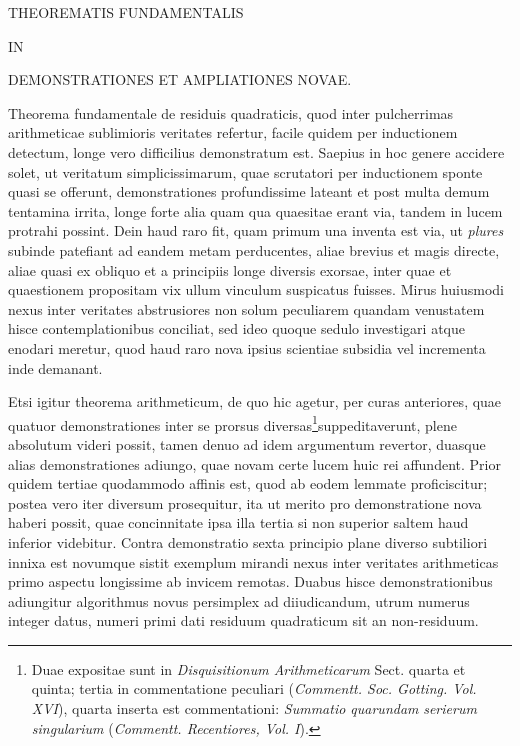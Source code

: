 \begin{center}
{\large THEOREMATIS FUNDAMENTALIS\par}
\smallskip IN\par
{}
\medskip DEMONSTRATIONES ET AMPLIATIONES NOVAE.\par
\end{center}
\BookRule{20mm}
Theorema fundamentale de residuis quadraticis, quod inter pulcherrimas arithmeticae sublimioris veritates refertur, facile quidem per inductionem detectum, longe vero difficilius demonstratum est. Saepius in hoc genere accidere solet, ut veritatum simplicissimarum, quae scrutatori per inductionem sponte quasi se offerunt, demonstrationes profundissime lateant et post multa demum tentamina irrita, longe forte alia quam qua quaesitae erant via, tandem in lucem protrahi possint. Dein haud raro fit, quam primum una inventa est via, ut \textit{plu}\textit{res} subinde patefiant ad eandem metam perducentes, aliae brevius et magis directe, aliae quasi ex obliquo et a principiis longe diversis exorsae, inter quae et quaestionem propositam vix ullum vinculum suspicatus fuisses. Mirus huiusmodi nexus inter veritates abstrusiores non solum peculiarem quandam venustatem hisce contemplationibus conciliat, sed ideo quoque sedulo investigari atque enodari meretur, quod haud raro nova ipsius scientiae subsidia vel incrementa inde demanant.

Etsi igitur theorema arithmeticum, de quo hic agetur, per curas anteriores, quae quatuor demonstrationes inter se prorsus diversas\begingroup\renewcommand{\thefootnote}{*)}\footnote{Duae expositae sunt in \textit{Disquisitionum Arithmeticarum} Sect. quarta et quinta; tertia in commentatione peculiari (\textit{Commentt. Soc. Gotting. Vol. XVI}), quarta inserta est commentationi: \textit{Summatio quarundam} \textit{serierum singularium} (\textit{Commentt. Recentiores, Vol. I}).}\endgroup suppeditaverunt, plene
%
absolutum videri possit, tamen denuo ad idem argumentum revertor, duasque alias demonstrationes adiungo, quae novam certe lucem huic rei affundent. Prior quidem tertiae quodammodo affinis est, quod ab eodem lemmate proficiscitur; postea vero iter diversum prosequitur, ita ut merito pro demonstratione nova haberi possit, quae concinnitate ipsa illa tertia si non superior saltem haud inferior videbitur. Contra demonstratio sexta principio plane diverso subtiliori innixa est novumque sistit exemplum mirandi nexus inter veritates arithmeticas primo aspectu longissime ab invicem remotas. Duabus hisce demonstrationibus adiungitur algorithmus novus persimplex ad diiudicandum, utrum numerus integer datus, numeri primi dati residuum quadraticum sit an non-residuum.

